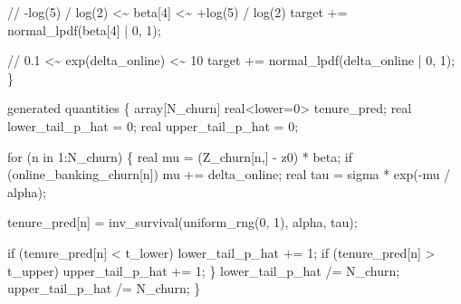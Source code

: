 \documentclass[
  letterpaper,
  DIV=11,
  numbers=noendperiod]{scrartcl}
\newenvironment{Shaded}{\begin{snugshade}}{\end{snugshade}}
\newcommand{\CommentTok}[1]{\textcolor[rgb]{0.37,0.37,0.37}{#1}}
\newcommand{\ControlFlowTok}[1]{\textcolor[rgb]{0.00,0.23,0.31}{#1}}
\newcommand{\DataTypeTok}[1]{\textcolor[rgb]{0.68,0.00,0.00}{#1}}
\newcommand{\DecValTok}[1]{\textcolor[rgb]{0.68,0.00,0.00}{#1}}
\newcommand{\KeywordTok}[1]{\textcolor[rgb]{0.00,0.23,0.31}{#1}}
\newcommand{\NormalTok}[1]{\textcolor[rgb]{0.00,0.23,0.31}{#1}}
\begin{document}
\begin{codelisting}
\begin{Shaded}
\begin{Highlighting}[]
  \CommentTok{// {-}log(5) / log(2) \textless{}\textasciitilde{} beta[4] \textless{}\textasciitilde{} +log(5) / log(2)}
  \KeywordTok{target +=}\NormalTok{ normal\_lpdf(beta[}\DecValTok{4}\NormalTok{] | }\DecValTok{0}\NormalTok{, }\DecValTok{1}\NormalTok{);}

  \CommentTok{// 0.1 \textless{}\textasciitilde{} exp(delta\_online) \textless{}\textasciitilde{} 10}
  \KeywordTok{target +=}\NormalTok{ normal\_lpdf(delta\_online | }\DecValTok{0}\NormalTok{, }\DecValTok{1}\NormalTok{);}
\NormalTok{\}}


\KeywordTok{generated quantities}\NormalTok{ \{}
  \DataTypeTok{array}\NormalTok{[N\_churn] }\DataTypeTok{real}\NormalTok{\textless{}}\KeywordTok{lower}\NormalTok{=}\DecValTok{0}\NormalTok{\textgreater{} tenure\_pred;}
  \DataTypeTok{real}\NormalTok{ lower\_tail\_p\_hat = }\DecValTok{0}\NormalTok{;}
  \DataTypeTok{real}\NormalTok{ upper\_tail\_p\_hat = }\DecValTok{0}\NormalTok{;}

  \ControlFlowTok{for}\NormalTok{ (n }\ControlFlowTok{in} \DecValTok{1}\NormalTok{:N\_churn) \{}
    \DataTypeTok{real}\NormalTok{ mu = (Z\_churn[n,] {-} z0) * beta;}
    \ControlFlowTok{if}\NormalTok{ (online\_banking\_churn[n])}
\NormalTok{      mu += delta\_online;}
    \DataTypeTok{real}\NormalTok{ tau = sigma * exp({-}mu / alpha);}

\NormalTok{    tenure\_pred[n]}
\NormalTok{      = inv\_survival(uniform\_rng(}\DecValTok{0}\NormalTok{, }\DecValTok{1}\NormalTok{), alpha, tau);}

    \ControlFlowTok{if}\NormalTok{ (tenure\_pred[n] \textless{} t\_lower)}
\NormalTok{      lower\_tail\_p\_hat += }\DecValTok{1}\NormalTok{;}
    \ControlFlowTok{if}\NormalTok{ (tenure\_pred[n] \textgreater{} t\_upper)}
\NormalTok{      upper\_tail\_p\_hat += }\DecValTok{1}\NormalTok{;}
\NormalTok{  \}}
\NormalTok{  lower\_tail\_p\_hat /= N\_churn;}
\NormalTok{  upper\_tail\_p\_hat /= N\_churn;}
\NormalTok{\}}
\end{Highlighting}
\end{Shaded}

\end{codelisting}
\end{document}
